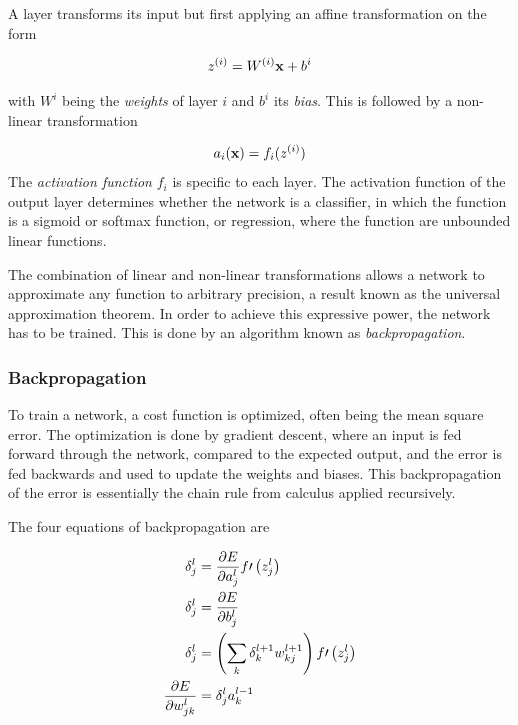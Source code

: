 A layer transforms its input but first applying an
affine transformation on the form

\begin{align*}
  z^{(i)} = W^{(i)}\vb{x} + b^{i}
\end{align*}

with \(W^{i}\) being the \textit{weights} of layer \(i\) and \(b^{i}\) its
\textit{bias}. This is followed by a non-linear transformation

\begin{align*}
  a_{i}(\vb{x}) = f_{i}(z^{(i)})
\end{align*}
The \textit{activation function } \(f_{i}\) is specific to each layer. 
The activation function of the output layer determines whether the network is a
classifier, in which the function is a sigmoid or softmax function, or regression,
where the function are unbounded linear functions.

The combination of linear and non-linear transformations allows a network to
approximate any function to arbitrary precision, a result known as the universal
approximation theorem\cite{mehta}. In order to achieve this expressive power,
the network has to be trained. This is done by an algorithm known as
\textit{backpropagation}.

\subsubsection{Backpropagation}

To train a network, a cost function is optimized, often being the mean square error.  The optimization is done by gradient descent, where an input is fed
forward through the network, compared to the expected output, and the error is
fed backwards and used to update the weights and biases. This backpropagation of
the error is essentially the chain rule from calculus applied recursively.

The four equations of backpropagation are

\begin{align*}
  \delta_{j}^{l} &= \pdv{E}{a_{j}^{l}}f\prime\left( z_{j}^{l} \right)\\
  \delta_{j}^{l} &= \pdv{E}{b_{j}^{l}}\\
  \delta_{j}^{l} &= \left( \sum_{k}\delta_{k}^{l+1}w_{kj}^{l+1} \right)f\prime\left( z_{j}^{l} \right)\\
  \pdv{E}{w_{jk}^{l}} &= \delta_{j}^{l}a_{k}^{l-1}
\end{align*}

